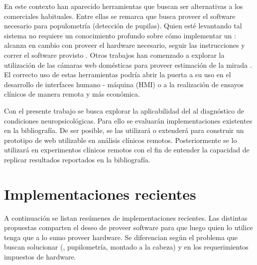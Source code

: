 En este contexto han aparecido herramientas que buscan ser alternativas a los
\eyetrackers comerciales habituales.
Entre ellas se remarca \pupilext que busca proveer el software necesario para
populometría (detección de pupilas).
Quien esté levantando tal sistema no requiere un conocimiento profundo sobre
cómo implementar un \eyetracker: alcanza en cambio con proveer el hardware
necesario, seguir las instrucciones y correr el software provisto
\cite{zandi_2021_pupilext}.
Otros trabajos han comenzado a explorar la utilización de las cámaras web
domésticas para proveer estimación de la mirada \cite{xu_2015_turker_gaze,
papoutsaki_2016_webgazer, huang_2016_pace}.
El correcto uso de estas herramientas podría abrir la puerta a su uso en el
desarrollo de interfaces humano - máquina (HMI) o a la realización de ensayos
clínicos de manera remota y más económica.

Con el presente trabajo se busca explorar la aplicabilidad del \eyetracking
\online al diagnóstico de condiciones neuropsicológicas.
Para ello se evaluarán implementaciones existentes en la bibliografía.
De ser posible, se las utilizará o extenderá para construir un prototipo de
\eyetracker web utilizable en análisis clínicos remotos.
Posteriormente se lo utilizará en experimentos clínicos remotos con el fin de
entender la capacidad de replicar resultados reportados en la bibliografía.

\section{Implementaciones recientes}

A continuación se listan resúmenes de implementaciones recientes.
Las distintas propuestas comparten el deseo de proveer software para que luego
quien lo utilice tenga que a lo sumo proveer hardware.
Se diferencian según el problema que buscan solucionar (\eg, pupilometría,
\eyetracking montado a la cabeza) y en los requerimientos impuestos de
hardware.

